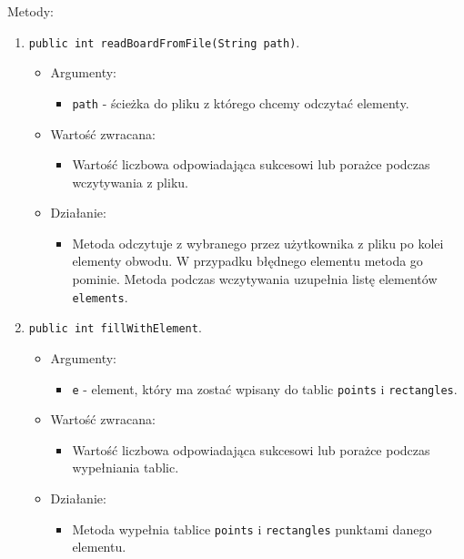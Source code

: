 \documentclass[a4paper,11pt, notitlepage ]{article}
\begin{document}
Metody:
\begin{enumerate}
\item \verb+public int readBoardFromFile(String path)+.
\begin{itemize}
\item Argumenty:
\begin{itemize}
\item \verb+path+ - ścieżka do pliku z którego chcemy odczytać elementy.
\end{itemize}
\item Wartość zwracana:
\begin{itemize}
\item Wartość liczbowa odpowiadająca sukcesowi lub porażce podczas wczytywania z pliku.
\end{itemize}
\item Działanie:
\begin{itemize}
\item Metoda odczytuje z wybranego przez użytkownika z pliku po kolei elementy obwodu. W przypadku błędnego elementu metoda go pominie. Metoda podczas wczytywania uzupełnia listę elementów \verb+elements+.
\end{itemize}
\end{itemize}


\item \verb+public int fillWithElement+.
\begin{itemize}
\item Argumenty:
\begin{itemize}
\item \verb+e+ - element, który ma zostać wpisany do tablic \verb+points+ i \verb+rectangles+.
\end{itemize}
\item Wartość zwracana:
\begin{itemize}
\item Wartość liczbowa odpowiadająca sukcesowi lub porażce podczas wypełniania tablic.
\end{itemize}
\item Działanie:
\begin{itemize}
\item Metoda wypełnia tablice \verb+points+ i \verb+rectangles+ punktami danego elementu.
\end{itemize}
\end{itemize}


\end{enumerate}
\end{document}

